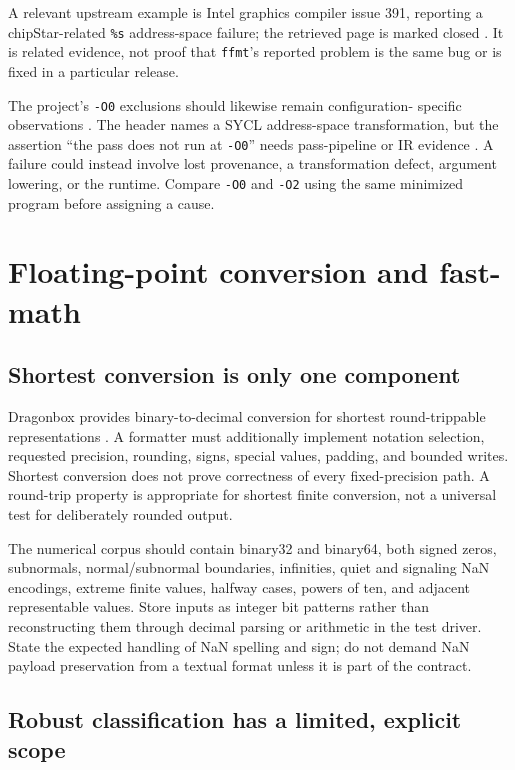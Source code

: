 \documentclass[11pt,letterpaper]{article}
\newcommand{\ffmt}{\texttt{ffmt}}
\begin{document}
A relevant upstream example is Intel graphics compiler issue 391, reporting
a chipStar-related \texttt{\%s} address-space failure; the retrieved page is
marked closed \cite{igc391}. It is related evidence, not proof that \ffmt's
reported problem is the same bug or is fixed in a particular release.

The project's \texttt{-O0} exclusions should likewise remain configuration-
specific observations \cite{ffmt-makefile}. The header names a SYCL
address-space transformation, but the assertion ``the pass does not run at
\texttt{-O0}'' needs pass-pipeline or IR evidence \cite{ffmt-source}.
A failure could instead involve lost provenance, a transformation defect,
argument lowering, or the runtime. Compare \texttt{-O0} and \texttt{-O2}
using the same minimized program before assigning a cause.

\section{Floating-point conversion and fast-math}

\subsection{Shortest conversion is only one component}

Dragonbox provides binary-to-decimal conversion for shortest round-trippable
representations \cite{dragonbox}. A formatter must additionally implement
notation selection, requested precision, rounding, signs, special values,
padding, and bounded writes. Shortest conversion does not prove correctness
of every fixed-precision path. A round-trip property is appropriate for
shortest finite conversion, not a universal test for deliberately rounded
output.

The numerical corpus should contain binary32 and binary64, both signed zeros,
subnormals, normal/subnormal boundaries, infinities, quiet and signaling NaN
encodings, extreme finite values, halfway cases, powers of ten, and adjacent
representable values. Store inputs as integer bit patterns rather than
reconstructing them through decimal parsing or arithmetic in the test driver.
State the expected handling of NaN spelling and sign; do not demand NaN
payload preservation from a textual format unless it is part of the contract.

\subsection{Robust classification has a limited, explicit scope}
\end{document}
